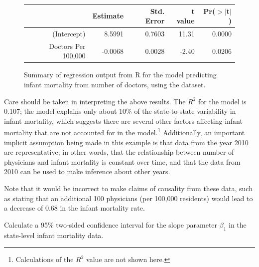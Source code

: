 \begin{figure}[h]
	\centering
	\begin{tabular}{rrrrr}
		\hline
		& Estimate & Std. Error & t value & Pr($>$$|$t$|$) \\ 
		\hline
		(Intercept) & 8.5991 & 0.7603 & 11.31 & 0.0000 \\ 
		Doctors Per 100,000 & -0.0068 & 0.0028 & -2.40 & 0.0206 \\ 
		\hline
	\end{tabular}
	\caption{Summary of regression output from \textsf{R} for the model predicting infant mortality from number of doctors, using the  dataset.}
	\label{infantMortalityInferenceOutput}
\end{figure}


Care should be taken in interpreting the above results. The $R^2$ for the model is 0.107; the model explains only about 10\% of the state-to-state variability in infant mortality, which suggests there are several other factors affecting infant mortality that are not accounted for in the model.\footnote{Calculations of the $R^2$ value are not shown here.} Additionally, an important implicit assumption being made in this example is that data from the year 2010 are representative; in other words, that the relationship between number of physicians and infant mortality is constant over time, and that the data from 2010 can be used to make inference about other years.

Note that it would be incorrect to make claims of causality from these data, such as stating that an additional 100 physicians (per 100,000 residents) would lead to a decrease of 0.68 in the infant mortality rate.

\begin{exercisewrap}
\begin{nexercise}
Calculate a 95\% two-sided confidence interval for the slope parameter $\beta_{1}$ in the state-level infant mortality data.\footnotemark{}
\end{nexercise}
\end{exercisewrap}


